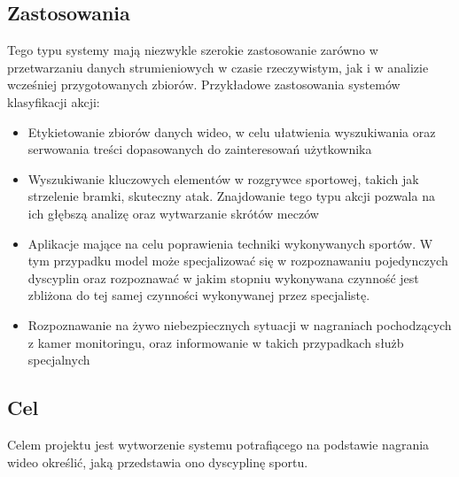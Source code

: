 \subsection{Zastosowania}
Tego typu systemy mają niezwykle szerokie zastosowanie zarówno w przetwarzaniu danych strumieniowych w czasie rzeczywistym, jak i w analizie wcześniej przygotowanych zbiorów. Przykładowe zastosowania systemów klasyfikacji akcji:
\begin{itemize}
    \item Etykietowanie zbiorów danych wideo, w celu ułatwienia wyszukiwania oraz serwowania treści dopasowanych do zainteresowań użytkownika
    \item Wyszukiwanie kluczowych elementów w rozgrywce sportowej, takich jak strzelenie bramki, skuteczny atak. Znajdowanie tego typu akcji pozwala na ich głębszą analizę oraz wytwarzanie skrótów meczów
    \item Aplikacje mające na celu poprawienia techniki wykonywanych sportów. W tym przypadku model może specjalizować się w rozpoznawaniu pojedynczych dyscyplin oraz rozpoznawać w jakim stopniu wykonywana czynność jest zbliżona do tej samej czynności wykonywanej przez specjalistę. 
    \item Rozpoznawanie na żywo niebezpiecznych sytuacji w nagraniach pochodzących z kamer monitoringu, oraz informowanie w takich przypadkach służb specjalnych 
\end{itemize}
\subsection{Cel}
Celem projektu jest wytworzenie systemu potrafiącego na podstawie nagrania wideo określić, jaką przedstawia ono dyscyplinę sportu. 
